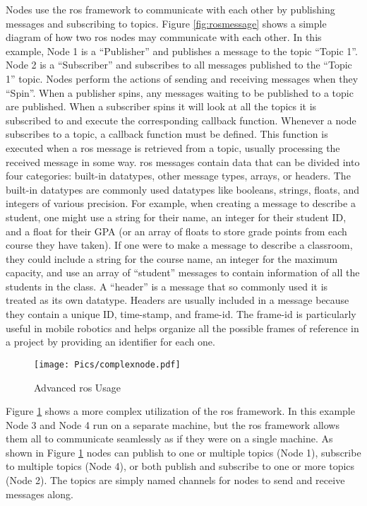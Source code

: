 Nodes use the \acrshort{ros} framework to communicate with each other by publishing messages and subscribing to topics. Figure \ref{fig:rosmessage} shows a simple diagram of how two \acrshort{ros} nodes may communicate with each other. In this example, Node 1 is a ``Publisher'' and publishes a message to the topic ``Topic 1''. Node 2 is a ``Subscriber'' and subscribes to all messages published to the ``Topic 1'' topic. Nodes perform the actions of sending and receiving messages when they ``Spin''. When a publisher spins, any messages waiting to be published to a topic are published. When a subscriber spins it will look at all the topics it is subscribed to and execute the corresponding callback function. Whenever a node subscribes to a topic, a callback function must be defined. This function is executed when a \acrshort{ros} message is retrieved from a topic, usually processing the received message in some way. \acrshort{ros} messages contain data that can be divided into four categories: built-in datatypes, other message types, arrays, or headers. The built-in datatypes are commonly used datatypes like booleans, strings, floats, and integers of various precision. For example, when creating a message to describe a student, one might use a string for their name, an integer for their student ID, and a float for their GPA (or an array of floats to store grade points from each course they have taken). If one were to make a message to describe a classroom, they could include a string for the course name, an integer for the maximum capacity, and use an array of ``student'' messages to contain information of all the students in the class. A ``header'' is a message that so commonly used it is treated as its own datatype. Headers are usually included in a message because they contain a unique ID, time-stamp, and frame-id. The frame-id is particularly useful in mobile robotics and helps organize all the possible frames of reference in a project by providing an identifier for each one.\\

\begin{figure}[h!]
    \centering
    \texttt{[image: Pics/complexnode.pdf]}
    \caption{Advanced \acrshort{ros} Usage}
    \label{fig:roscomplex}
\end{figure}

Figure \ref{fig:roscomplex} shows a more complex utilization of the \acrshort{ros} framework. In this example Node 3 and Node 4 run on a separate machine, but the \acrshort{ros} framework allows them all to communicate seamlessly as if they were on a single machine. As shown in Figure \ref{fig:roscomplex} nodes can publish to one or multiple topics (Node 1), subscribe to multiple topics (Node 4), or both publish and subscribe to one or more topics (Node 2). The topics are simply named channels for nodes to send and receive messages along.\\

